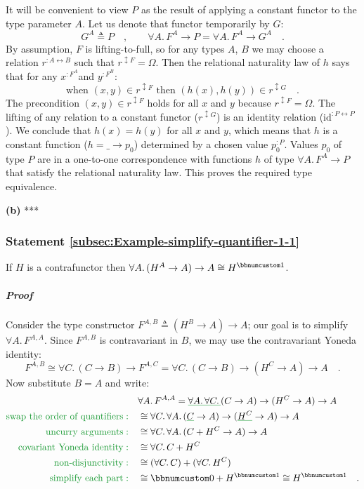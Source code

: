 It will be convenient to view $P$ as the result of applying a constant
functor to the type parameter $A$. Let us denote that functor temporarily
by $G$:
\[
G^{A}\triangleq P\quad,\quad\quad\forall A.\,F^{A}\rightarrow P=\forall A.\,F^{A}\rightarrow G^{A}\quad.
\]
By assumption, $F$ is lifting-to-full, so for any types $A$, $B$
we may choose a relation $r^{:A\leftrightarrow B}$ such that $r^{\updownarrow F}=\Omega$.
Then the relational naturality law of $h$ says that for any $x^{:F^{A}}$and
$y^{:F^{B}}$:
\[
\text{when }(x,y)\in r^{\updownarrow F}\text{ then }(h(x),h(y))\in r^{\updownarrow G}\quad.
\]
The precondition $(x,y)\in r^{\updownarrow F}$ holds for all $x$
and $y$ because $r^{\updownarrow F}=\Omega$. The lifting of any
relation to a constant functor ($r^{\updownarrow G}$) is an identity
relation ($\text{id}^{:P\leftrightarrow P}$). We conclude that $h(x)=h(y)$
for all $x$ and $y$, which means that $h$ is a constant function
($h=\_\rightarrow p_{0}$) determined by a chosen value $p_{0}^{:P}$.
Values $p_{0}$ of type $P$ are in a one-to-one correspondence with
functions $h$ of type $\forall A.\,F^{A}\rightarrow P$ that satisfy
the relational naturality law. This proves the required type equivalence.

\textbf{(b)} {*}{*}{*}

\subsubsection{Statement \label{subsec:Example-simplify-quantifier-1-1}\ref{subsec:Example-simplify-quantifier-1-1}}

If $H$ is a contrafunctor then $\forall A.\,(H^{A}\rightarrow A)\rightarrow A\cong H^{\bbnum 1}$.

\subparagraph{Proof}

Consider the type constructor $F^{A,B}\triangleq(H^{B}\rightarrow A)\rightarrow A$;
our goal is to simplify $\forall A.\,F^{A,A}$. Since $F^{A,B}$ is
contravariant in $B$, we may use the contravariant Yoneda identity:
\[
F^{A,B}\cong\forall C.\,(C\rightarrow B)\rightarrow F^{A,C}=\forall C.\,(C\rightarrow B)\rightarrow(H^{C}\rightarrow A)\rightarrow A\quad.
\]
Now substitute $B=A$ and write:
\begin{align*}
 & \forall A.\,F^{A,A}=\gunderline{\forall A.\,\forall C.\,}(C\rightarrow A)\rightarrow(H^{C}\rightarrow A)\rightarrow A\\
{\color{greenunder}\text{swap the order of quantifiers}:}\quad & \cong\forall C.\,\forall A.\,(\gunderline C\rightarrow A)\rightarrow(\gunderline{H^{C}}\rightarrow A)\rightarrow A\\
{\color{greenunder}\text{uncurry arguments}:}\quad & \cong\forall C.\,\forall A.\,(C+H^{C}\rightarrow A)\rightarrow A\\
{\color{greenunder}\text{covariant Yoneda identity}:}\quad & \cong\forall C.\,C+H^{C}\\
{\color{greenunder}\text{non-disjunctivity}:}\quad & \cong(\forall C.\,C)+(\forall C.\,H^{C})\\
{\color{greenunder}\text{simplify each part}:}\quad & \cong\bbnum 0+H^{\bbnum 1}\cong H^{\bbnum 1}\quad.
\end{align*}


